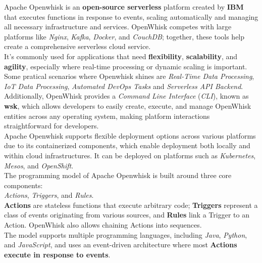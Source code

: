 Apache Openwhisk is an \textbf{open-source serverless} platform created by \textbf{IBM} that executes functions in response to events, scaling automatically and managing all necessary infrastructure and services. OpenWhisk competes with large platforms like \textit{Nginx}, \textit{Kafka}, \textit{Docker}, and \textit{CouchDB}; together, these tools help create a comprehensive serverless cloud service.\vspace{14pt}\\
It’s commonly used for applications that need \textbf{flexibility}, \textbf{scalability}, and \textbf{agility}, especially where real-time processing or dynamic scaling is important. Some pratical scenarios where Openwhisk shines are \textit{Real-Time Data Processing}, \textit{IoT Data Processing}, \textit{Automated DevOps Tasks} and \textit{Serverless API Backend}.\vspace{14pt}\\
Additionally, OpenWhisk provides a \textit{Command Line Interface} (\textit{CLI}), known as \textbf{wsk}, which allows developers to easily create, execute, and manage OpenWhisk entities across any operating system, making platform interactions straightforward for developers.\vspace{14pt}\\
Apache Openwhisk supports flexible deployment options across various platforms due to its containerized components, which enable deployment both locally and within cloud infrastructures. It can be deployed on platforms such as \textit{Kubernetes}, \textit{Mesos}, and \textit{OpenShift}.\vspace{14pt}\\
The programming model of Apache Openwhisk is built around three core components:\\
\textit{Actions}, \textit{Triggers}, and \textit{Rules}.\vspace{14pt}\\
\textbf{Actions} are stateless functions that execute arbitrary code; \textbf{Triggers} represent a class of events originating from various sources, and \textbf{Rules} link a Trigger to an Action. OpenWhisk also allows chaining Actions into sequences.\vspace{14pt}\\
The model supports multiple programming languages, including \textit{Java}, \textit{Python}, and \textit{JavaScript}, and uses an event-driven architecture where most \textbf{Actions execute in response to events}.\cite{quevedo2019evaluating}\vspace{10pt}
